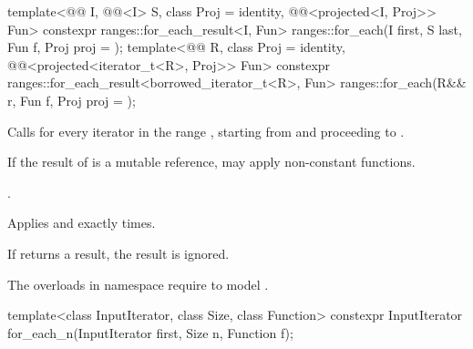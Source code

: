 %
\begin{itemdecl}
template<@@ I, @@<I> S, class Proj = identity,
         @@<projected<I, Proj>> Fun>
  constexpr ranges::for_each_result<I, Fun>
    ranges::for_each(I first, S last, Fun f, Proj proj = {});
template<@@ R, class Proj = identity,
         @@<projected<iterator_t<R>, Proj>> Fun>
  constexpr ranges::for_each_result<borrowed_iterator_t<R>, Fun>
    ranges::for_each(R&& r, Fun f, Proj proj = {});
\end{itemdecl}

\begin{itemdescr}
\pnum
\effects
Calls 
for every iterator  in the range ,
starting from  and proceeding to .
\begin{note}
If the result of  is a mutable reference,
 may apply non-constant functions.
\end{note}

\pnum
\returns
{}.

\pnum
\complexity
Applies  and  exactly  times.

\pnum
\remarks
If  returns a result, the result is ignored.

\pnum
\begin{note}
The overloads in namespace  require
 to model .
\end{note}
\end{itemdescr}

%
\begin{itemdecl}
template<class InputIterator, class Size, class Function>
  constexpr InputIterator for_each_n(InputIterator first, Size n, Function f);
\end{itemdecl}

